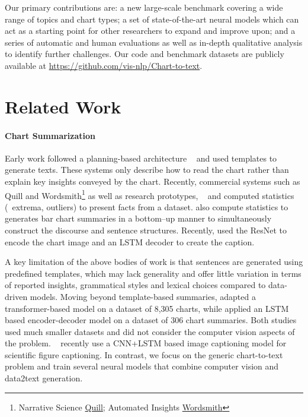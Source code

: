 \documentclass[11pt]{article}
\newcommand{\change}[1]{{\leavevmode\color{black}#1}}%
\begin{document}
Our primary contributions are: \Ni a new large-scale benchmark 
covering a wide range of topics and chart types; \Nii a set of state-of-the-art neural models 
which can act as a starting point for other researchers to expand and improve upon; and \Niii a series of automatic and human evaluations as well as in-depth qualitative analysis to identify further challenges.
Our code and benchmark datasets are publicly available at
\href{https://github.com/vis-nlp/Chart-to-text}{https://github.com/vis-nlp/Chart-to-text}.



\section{Related Work}


\paragraph{Chart Summarization}


Early work 
\cite{mittal-etal-1998-describing,Ferres-accessibility-2013} followed a planning-based architecture ~\cite{reiter2007architecture} and used templates to generate texts. 
These systems only describe how to read the chart rather than explain key insights conveyed by the chart. 
Recently, commercial systems such as  Quill and Wordsmith\footnote{Narrative Science \href{https://narrativescience.com/quill/}{Quill}; Automated Insights \href{https://automatedinsights.com/wordsmith}{Wordsmith}}
as well as research prototypes, \eg\ \cite{cui2019datasite} and  \cite{srinivasan2018augmenting}  
computed statistics  (\eg\ extrema, outliers) to present facts from a dataset. \citet{demir-etal-2012-summarizing} also compute statistics to generates bar chart summaries in a bottom–up manner to simultaneously construct the discourse and sentence structures. Recently, \citet{DBLP:journals/corr/abs-1906-02850} used the ResNet \cite{he2016deep} to encode the chart image and an LSTM decoder to create the caption. 

A key limitation of the above bodies of work is that sentences are generated using predefined templates, which may lack generality and offer little variation in terms of reported insights, grammatical styles and lexical choices compared to data-driven models. Moving beyond template-based summaries, \citet{obeid} adapted a transformer-based  model on a dataset of 8,305 
charts,  while \citet{Andrea-carenini} applied an LSTM based encoder-decoder model on a dataset of 306 
chart summaries. Both studies used much smaller datasets and did not consider the computer vision aspects of the problem. \change{~\citet{hsu2021scicap} recently use a CNN+LSTM based image captioning model for scientific figure captioning.} In contrast, \change{we focus on the generic chart-to-text problem and} train several 
 neural models that combine computer vision and data2text generation. 
\end{document}
